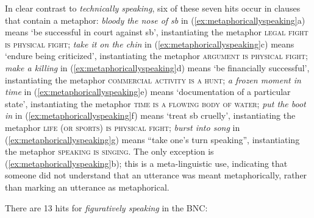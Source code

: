 In clear contrast to \textit{technically speaking}, six of these seven hits occur in clauses that contain a metaphor:  \textit{bloody the nose of sb} in (\ref{ex:metaphoricallyspeaking}a) means `be successful in court against sb', instantiating the metaphor \textsc{legal fight is physical fight}; \textit{take it on the chin} in (\ref{ex:metaphoricallyspeaking}c) means `endure being criticized', instantiating the metaphor \textsc{argument is physical fight}; \textit{make a killing} in (\ref{ex:metaphoricallyspeaking}d) means `be financially successful', instantiating the metaphor \textsc{commercial activity is a hunt}; \textit{a frozen moment in time} in (\ref{ex:metaphoricallyspeaking}e) means `documentation of a particular state', instantiating the metaphor \textsc{time is a flowing body of water}; \textit{put the boot in} in (\ref{ex:metaphoricallyspeaking}f) means `treat sb cruelly', instantiating the metaphor \textsc{life (or sports) is physical fight}; \textit{burst into song} in (\ref{ex:metaphoricallyspeaking}g) means ``take one's turn speaking'', instantiating the metaphor \textsc{speaking is singing}. The only exception is (\ref{ex:metaphoricallyspeaking}b); this is a meta-linguistic use, indicating that someone did not understand that an utterance was meant metaphorically,  rather than marking an utterance as metaphorical.

There are 13 hits for \textit{figuratively speaking} in the  BNC:

